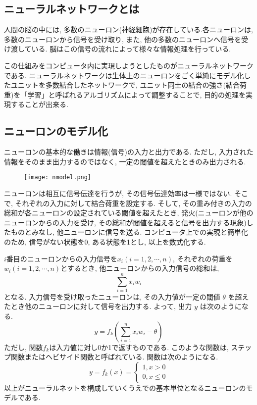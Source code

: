 \documentclass[10pt]{jsarticle}
\begin{document}
	\subsection{ニューラルネットワークとは}
		人間の脳の中には, 多数のニューロン(神経細胞)が存在している.各ニューロンは, 多数のニューロンから信号を受け取り, また, 他の多数のニューロンへ信号を受け渡している. 脳はこの信号の流れによって様々な情報処理を行っている. \par
		この仕組みをコンピュータ内に実現しようとしたものがニューラルネットワークである. ニューラルネットワークは生体上のニューロンをごく単純にモデル化したユニットを多数結合したネットワークで, ユニット同士の結合の強さ(結合荷重)を「学習」と呼ばれるアルゴリズムによって調整することで, 目的の処理を実現することが出来る. \par
		
\newpage
		
	\subsection{ニューロンのモデル化}
		ニューロンの基本的な働きは情報(信号)の入力と出力である. ただし, 入力された情報をそのまま出力するのではなく, 一定の閾値を超えたときのみ出力される. 
		\begin{figure}[htbp]
			\begin{center}
				\texttt{[image: nmodel.png]}
			\end{center}
		\end{figure}
		
		ニューロンは相互に信号伝達を行うが, その信号伝達効率は一様ではない. そこで, それぞれの入力に対して結合荷重を設定する. そして, その重み付きの入力の総和が各ニューロンの設定されている閾値を超えたとき, 発火(ニューロンが他のニューロンからの入力を受け, その総和が閾値を超えると信号を出力する現象)したものとみなし, 他ニューロンに信号を送る. コンピュータ上での実現と簡単化のため, 信号がない状態を0, ある状態を1とし, 以上を数式化する. \par
		$i$番目のニューロンからの入力信号を$x_{i} (i = 1, 2, \cdots , n)$, それぞれの荷重を $w_{i} (i = 1, 2, \cdots , n)$とするとき, 他ニューロンからの入力信号の総和は, 
		\[
			\sum_{i = 1}^{n}x_{i} w_{i}
		\]
		となる. 入力信号を受け取ったニューロンは, その入力値が一定の閾値 $\theta$ を超えたとき他のニューロンに対して信号を出力する. よって, 出力 $y$ は次のようになる.
		\[
			y = f_{k}\left( \sum_{i = 1}^{n} x_{i}w_{i} - \theta \right)
		\]
		ただし, 関数$f_{k}$は入力値に対し0か1で返すものである. このような関数は, ステップ関数またはヘビサイド関数と呼ばれている. 関数は次のようになる.
		\[
			y = f_{k}(x) = \left\{
														\begin{array}{l}
														1, x > 0 \\
														0, x \leq 0
														\end{array}
											\right.
		\]
		以上がニューラルネットを構成していくうえでの基本単位となるニューロンのモデルである.
	
\end{document}
